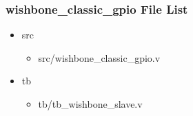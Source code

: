 \subsubsection{wishbone\_classic\_gpio File List}
\begin{itemize}
\item src
	\begin{itemize}
	\item src/wishbone\_classic\_gpio.v
	\end{itemize}
\item tb
	\begin{itemize}
	\item tb/tb\_wishbone\_slave.v
	\end{itemize}
\end{itemize}
